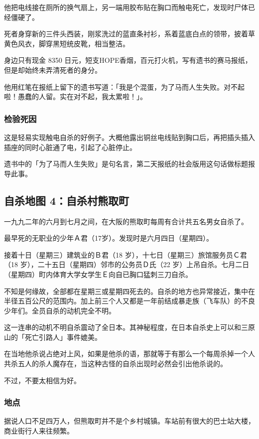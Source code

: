 \documentclass[UTF8]{ctexart}
\begin{document}
他把电线接在厕所的换气扇上，另一端用胶布贴在胸口而触电死亡，发现时尸体已经僵硬了。

死者身穿新的三件头西装，刚浆洗过的蓝直条衬衫，系着蓝底白点的领带，披着草黄色风衣，脚穿黑短统皮靴，相当整洁。

身边只有现金 8350 日元，短支HOPE香烟，百元打火机，写有遗书的赛马报纸，但是却始终未弄清死者的身分。

他用红笔在报纸上留下的遗书写道：「我是个混蛋，为了马而人生失败。对不起啦！愚蠢的人留。实在对不起，我太累啦！」。

\subsubsection*{检验死因}

这是轻易实现触电自杀的好例子。大概他露出铜丝电线贴到胸口后，再把插头插入插座的同时心脏通了电，引起了心脏停止。

遗书中的「为了马而人生失败」是句名言，第二天报纸的社会版用这句话做标题报导此事。


\subsection{自杀地图 4：自杀村熊取町}

一九九二年的六月到七月之间，在大阪的熊取町每周有合计共五名男女自杀了。

最早死的无职业的少年Ａ君（17岁）。发现时是六月四日（星期四）。

接着十日（星期三）建筑业的Ｂ君（18 岁），十七日（星期三）旅馆服务员Ｃ君（18 岁），二十五日（星期四）邻市的公务员Ｄ氏（22 岁）上吊自杀。七月二日（星期四）町内体育大学女学生Ｅ向自已胸口猛刺三刀自杀。 

不知是何缘故，全部都在星期三或星期四死去的。自杀的地方也异常接近，集中在半径五百公尺的范围内。加上前三个人又都是一年前结成暴走族（飞车队）的不良少年们。全员自杀的动机完全不明。

这一连串的动机不明自杀震动了全日本。其神秘程度，在日本自杀史上可以和三原山的「死亡引路人」事件媲美。 

在当地他杀说占绝对上风，如果是他杀的语，那就等于有那么一个每周杀掉一个人共杀五人的杀人魔存在，当这种古怪的自杀出现时必然会引出他杀说的。

不过，不要太相信为好。

\subsubsection*{地点}

据说人口不足四万人，但熊取町并不是个乡村城镇。车站前有很大的巴士站大楼，商业街行人来往频繁。
\end{document}
